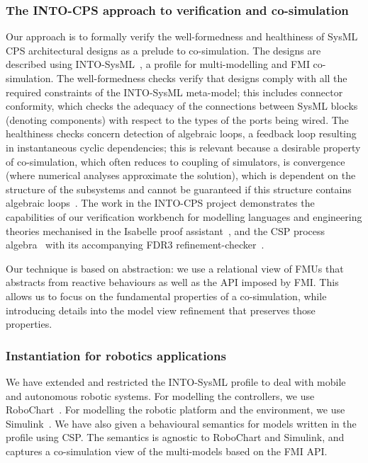 \subsubsection{The INTO-CPS approach to verification and co-simulation}

Our approach is to formally verify the well-formedness and healthiness of SysML CPS architectural designs as a prelude to co-simulation. The designs are described using INTO-SysML~\cite{INTO-CPS-D2.1a-2015}, a profile for multi-modelling and FMI co-simulation. The well-formedness checks verify that designs comply with all the required constraints of the INTO-SysML meta-model; this includes connector conformity, which checks the adequacy of the connections between SysML blocks (denoting components) with respect to the types of the ports being wired. The healthiness checks concern detection of algebraic loops, a feedback loop resulting in instantaneous cyclic dependencies; this is relevant because a desirable property of co-simulation, which often reduces to coupling of simulators, is convergence (where numerical analyses approximate the solution), which is dependent on the structure of the subsystems and cannot be guaranteed if this structure contains algebraic loops~\cite{KublerS2000,BromanBGLMTW2013}. The work in the INTO-CPS project demonstrates the capabilities of our verification workbench for modelling languages and engineering theories mechanised in the Isabelle proof assistant~\cite{NipkowK2014}, and the CSP process algebra~\cite{Hoare1985} with its accompanying FDR3 refinement-checker~\cite{GibsonRobinsonABR2016}.

Our technique is based on abstraction: we use a relational view of FMUs that abstracts from reactive behaviours as well as the API imposed by FMI. This allows us to focus on the fundamental properties of a co-simulation, while introducing details into the model view refinement that preserves those properties.

\subsubsection{Instantiation for robotics applications}

We have extended and restricted the INTO-SysML profile to deal with mobile and autonomous robotic systems. For modelling the controllers, we use RoboChart~\cite{LiMRCWT2017}. For modelling the robotic platform and the environment, we use Simulink~\cite{MathworksURL}. We have also given a behavioural semantics for models written in the profile using CSP. The semantics is agnostic to RoboChart and Simulink, and captures a co-simulation view of the multi-models based on the FMI API.

